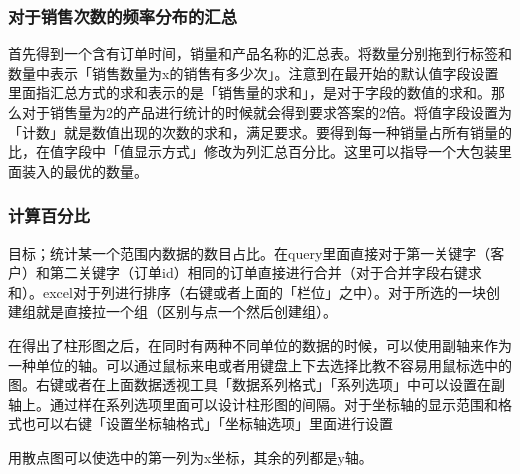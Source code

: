 \documentclass[10pt, a4paper]{article}
\begin{document}
            \subsubsection{对于销售次数的频率分布的汇总}
            首先得到一个含有订单时间，销量和产品名称的汇总表。将数量分别拖到行标签和数量中表示「销售数量为x的销售有多少次」。注意到在最开始的默认值字段设置里面指汇总方式的求和表示的是「销售量的求和」，是对于字段的数值的求和。那么对于销售量为2的产品进行统计的时候就会得到要求答案的2倍。将值字段设置为「计数」就是数值出现的次数的求和，满足要求。要得到每一种销量占所有销量的比，在值字段中「值显示方式」修改为列汇总百分比。这里可以指导一个大包装里面装入的最优的数量。
            \subsubsection{计算百分比}
            目标；统计某一个范围内数据的数目占比。在query里面直接对于第一关键字（客户）和第二关键字（订单id）相同的订单直接进行合并（对于合并字段右键求和）。excel对于列进行排序（右键或者上面的「栏位」之中）。对于所选的一块创建组就是直接拉一个组（区别与点一个然后创建组）。

            在得出了柱形图之后，在同时有两种不同单位的数据的时候，可以使用副轴来作为一种单位的轴。可以通过鼠标来电或者用键盘上下去选择比教不容易用鼠标选中的图。右键或者在上面数据透视工具「数据系列格式」「系列选项」中可以设置在副轴上。通过样在系列选项里面可以设计柱形图的间隔。对于坐标轴的显示范围和格式也可以右键「设置坐标轴格式」「坐标轴选项」里面进行设置

            用散点图可以使选中的第一列为x坐标，其余的列都是y轴。
\end{document}
